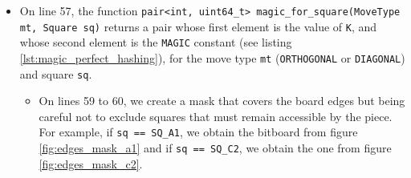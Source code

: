 \documentclass[12pt,a4paper,twoside,openright]{book}
\begin{document}
\begin{itemize}
\begin{itemize}
\item On line 48, we transform the destination square \texttt{to} into a bitboard that contains a single $1$, on the bit corresponding to the square.
\item On line 49, we test whether there is an obstacle on the square we want to move to using the bitboard we just created and the bitboard \texttt{occupied} containing the obstacles on the board.
\item On line 50, we add the new square as a possible move.
\item On line 51, we move one square in direction \texttt{d}.
\end{itemize}

\item On line 57, the function \texttt{pair<int, uint64_t> magic_for_square(MoveType mt, Square sq)} returns a pair whose first element is the value of \texttt{K}, and whose second element is the \texttt{MAGIC} constant (see listing \ref{lst:magic_perfect_hashing}), for the move type \texttt{mt} (\texttt{ORTHOGONAL} or \texttt{DIAGONAL}) and square \texttt{sq}.
\begin{itemize}
\item On lines 59 to 60, we create a mask that covers the board edges but being careful not to exclude squares that must remain accessible by the piece. For example, if \texttt{sq == SQ_A1}, we obtain the bitboard from figure \ref{fig:edges_mask_a1} and if \texttt{sq == SQ_C2}, we obtain the one from figure \ref{fig:edges_mask_c2}.


\end{itemize}
\end{itemize}
\end{document}
